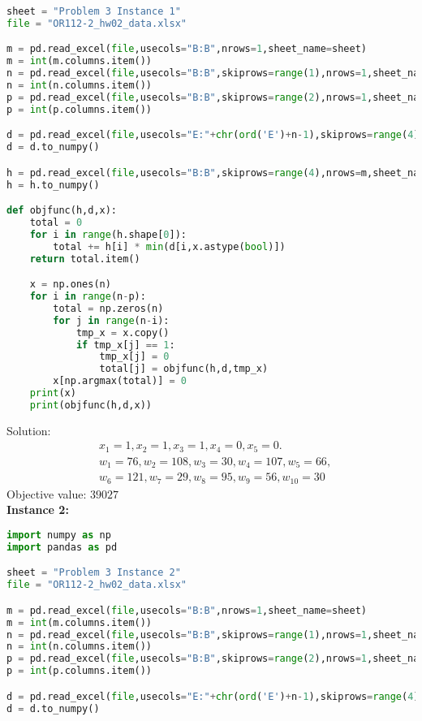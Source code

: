 \documentclass[12pt]{article}
\begin{document}
\begin{enumerate}
\begin{enumerate}
\begin{lstlisting}[language=Python]
sheet = "Problem 3 Instance 1"
file = "OR112-2_hw02_data.xlsx"

m = pd.read_excel(file,usecols="B:B",nrows=1,sheet_name=sheet)
m = int(m.columns.item())
n = pd.read_excel(file,usecols="B:B",skiprows=range(1),nrows=1,sheet_name=sheet)
n = int(n.columns.item())
p = pd.read_excel(file,usecols="B:B",skiprows=range(2),nrows=1,sheet_name=sheet)
p = int(p.columns.item())

d = pd.read_excel(file,usecols="E:"+chr(ord('E')+n-1),skiprows=range(4),nrows=m,sheet_name=sheet)
d = d.to_numpy()

h = pd.read_excel(file,usecols="B:B",skiprows=range(4),nrows=m,sheet_name=sheet)
h = h.to_numpy()

def objfunc(h,d,x):
    total = 0
    for i in range(h.shape[0]):
        total += h[i] * min(d[i,x.astype(bool)])
    return total.item()

    x = np.ones(n)
    for i in range(n-p):
        total = np.zeros(n)
        for j in range(n-i):
            tmp_x = x.copy()
            if tmp_x[j] == 1:
                tmp_x[j] = 0
                total[j] = objfunc(h,d,tmp_x)
        x[np.argmax(total)] = 0
    print(x)
    print(objfunc(h,d,x))    
                        \end{lstlisting}
                        Solution:
                        \begin{align*}
                              &x_1 = 1, x_2 = 1, x_3 = 1, x_4 = 0, x_5 = 0.\\
                              &w_1 = 76, w_2 = 108, w_3 = 30, w_4 = 107, w_5 = 66,\\ 
                              &w_6 = 121, w_7 = 29, w_8 = 95, w_9 = 56, w_{10} = 30
                        \end{align*}
                        Objective value:  $39027$\\
                        \textbf{Instance 2:}
                        \begin{lstlisting}[language=Python]
import numpy as np
import pandas as pd

sheet = "Problem 3 Instance 2"
file = "OR112-2_hw02_data.xlsx"

m = pd.read_excel(file,usecols="B:B",nrows=1,sheet_name=sheet)
m = int(m.columns.item())
n = pd.read_excel(file,usecols="B:B",skiprows=range(1),nrows=1,sheet_name=sheet)
n = int(n.columns.item())
p = pd.read_excel(file,usecols="B:B",skiprows=range(2),nrows=1,sheet_name=sheet)
p = int(p.columns.item())

d = pd.read_excel(file,usecols="E:"+chr(ord('E')+n-1),skiprows=range(4),nrows=m,sheet_name=sheet)
d = d.to_numpy()


\end{lstlisting}
\end{enumerate}
\end{enumerate}
\end{document}
